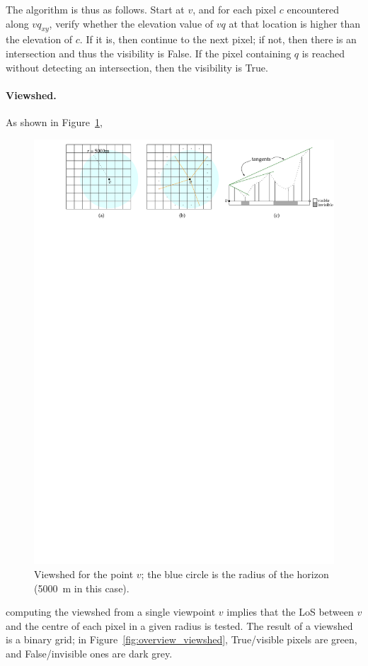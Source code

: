 The algorithm is thus as follows.
Start at $v$, and for each pixel $c$ encountered along $vq_{xy}$, verify whether the elevation value of $vq$ at that location is higher than the elevation of $c$.
If it is, then continue to the next pixel; if not, then there is an intersection and thus the visibility is False.
If the pixel containing $q$ is reached without detecting an intersection, then the visibility is True.


\paragraph{Viewshed.}
As shown in Figure~\ref{fig:viewshed},
\begin{figure}
  \centering
  \includegraphics[width=\linewidth]{viewshed}
  \caption{Viewshed for the point $v$; the blue circle is the radius of the horizon (\qty{5000}{\m} in this case).}%
\label{fig:viewshed}
\end{figure}
computing the viewshed from a single viewpoint $v$ implies that the LoS between $v$ and the centre of each pixel in a given radius is tested. 
The result of a viewshed is a binary grid; in Figure~\ref{fig:overview_viewshed}, True/visible pixels are green, and False/invisible ones are dark grey.

